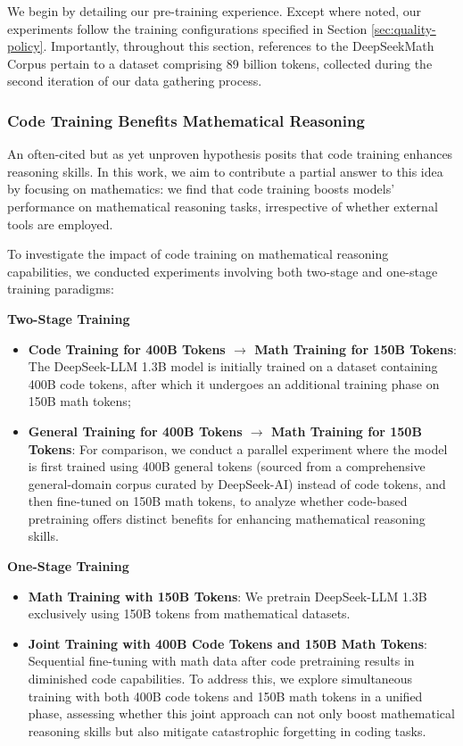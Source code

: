 \begin{itemize}[topsep=0pt]
We begin by detailing our pre-training experience. Except where noted, our experiments follow the training configurations specified in Section \ref{sec:quality-policy}. Importantly, throughout this section, references to the DeepSeekMath Corpus pertain to a dataset comprising 89 billion tokens, collected during the second iteration of our data gathering process.

\subsubsection{Code Training Benefits Mathematical Reasoning}

An often-cited but as yet unproven hypothesis posits that code training enhances reasoning skills. In this work, we aim to contribute a partial answer to this idea by focusing on mathematics: we find that code training boosts models' performance on mathematical reasoning tasks, irrespective of whether external tools are employed.

To investigate the impact of code training on mathematical reasoning capabilities, we conducted experiments involving both two-stage and one-stage training paradigms:

\textbf{Two-Stage Training}

\begin{itemize}[topsep=0pt]
    \item \textbf{Code Training for 400B Tokens $\rightarrow$ Math Training for 150B Tokens}: The DeepSeek-LLM 1.3B model is initially trained on a dataset containing 400B code tokens, after which it undergoes an additional training phase on 150B math tokens;
    \item \textbf{General Training for 400B Tokens $\rightarrow$ Math Training for 150B Tokens}: For comparison, we conduct a parallel experiment where the model is first trained using 400B general tokens (sourced from a comprehensive general-domain corpus curated by DeepSeek-AI) instead of code tokens, and then fine-tuned on 150B math tokens, to analyze whether code-based pretraining offers distinct benefits for enhancing mathematical reasoning skills.
\end{itemize}

\textbf{One-Stage Training}

\begin{itemize}[topsep=0pt]
    \item \textbf{Math Training with 150B Tokens}: We pretrain DeepSeek-LLM 1.3B exclusively using 150B tokens from mathematical datasets.
    \item \textbf{Joint Training with 400B Code Tokens and 150B Math Tokens}: Sequential fine-tuning with math data after code pretraining results in diminished code capabilities. To address this, we explore simultaneous training with both 400B code tokens and 150B math tokens in a unified phase, assessing whether this joint approach can not only boost mathematical reasoning skills but also mitigate catastrophic forgetting in coding tasks.
\end{itemize}


\end{itemize}
